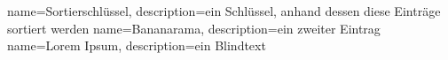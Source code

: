 {
  name=Sortierschlüssel,
  description={ein Schlüssel, anhand dessen diese Einträge sortiert werden}
}
{
  name=Bananarama,
  description={ein zweiter Eintrag}
}
{
  name=Lorem Ipsum,
  description={ein Blindtext}
}

\renewcommand*{\glossaryname}{\section{\glossarName}}

\glsaddall
\printglossaries

